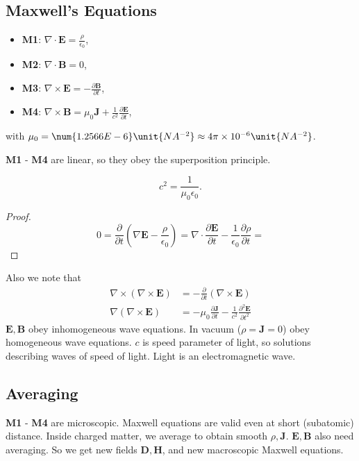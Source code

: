 \subsection{Maxwell's Equations}
\leavevmode
\begin{theorem}
    \leavevmode
    \begin{itemize}
        \item \textbf{M1}: \(\nabla \cdot \mathbf{E}  = \frac{\rho}{\epsilon_0}\),
        \item \textbf{M2}: \(\nabla \cdot \mathbf{B}  = 0\),
        \item \textbf{M3}: \(\nabla \times \mathbf{E} = - \frac{\partial \mathbf{B}}{\partial t} \),
        \item \textbf{M4}: \(\nabla \times \mathbf{B} = \mu_0 \mathbf{J} + \frac{1}{c^2} \frac{\partial \mathbf{E} }{\partial t}\),
    \end{itemize}
    with \(\mu_0 = \num{1.2566E-6}\unit{NA^{-2}}\approx 4\pi\times 10^{-6}\unit{NA^{-2}}\).
\end{theorem}
\begin{remark}
    \textbf{M1} - \textbf{M4} are linear, so they obey the superposition principle.
\end{remark}
\begin{proposition}
    \leavevmode
    \[
        c^2 = \frac{1}{\mu_0\epsilon_0}.
    \]
\end{proposition}
\begin{proof}
    \[
        0 = \frac{\partial }{\partial t} (\nabla \mathbf{E} - \frac{\rho}{\epsilon_0}) = \nabla \cdot \frac{\partial \mathbf{E} }{\partial t} - \frac{1}{\epsilon_0}\frac{\partial \rho}{\partial t} = 
    \]
\end{proof}
Also we note that
\begin{align*}
    \nabla \times (\nabla \times \mathbf{E} ) &= - \frac{\partial }{\partial t} (\nabla \times \mathbf{E} )\\
    \nabla (\nabla\times \mathbf{E}) &= - \mu_0 \frac{\partial \mathbf{J}}{\partial t} - \frac{1}{c^2}\frac{\partial^2 \mathbf{E} }{\partial t^2}  
\end{align*}
\(\mathbf{E},\mathbf{B} \) obey inhomogeneous wave equations. In vacuum (\(\rho = \mathbf{J} = 0\)) obey homogeneous wave equations. \(c\) is speed parameter of light, so solutions describing waves of speed of light. Light is an electromagnetic wave.
\subsection{Averaging}
\textbf{M1} - \textbf{M4} are microscopic. Maxwell equations are valid even at short (subatomic) distance. Inside charged matter, we average to obtain smooth \(\rho, \mathbf{J} \). \(\mathbf{E} , \mathbf{B} \) also need averaging. So we get new fields \(\mathbf{D}, \textbf{H} \), and new macroscopic Maxwell equations.


